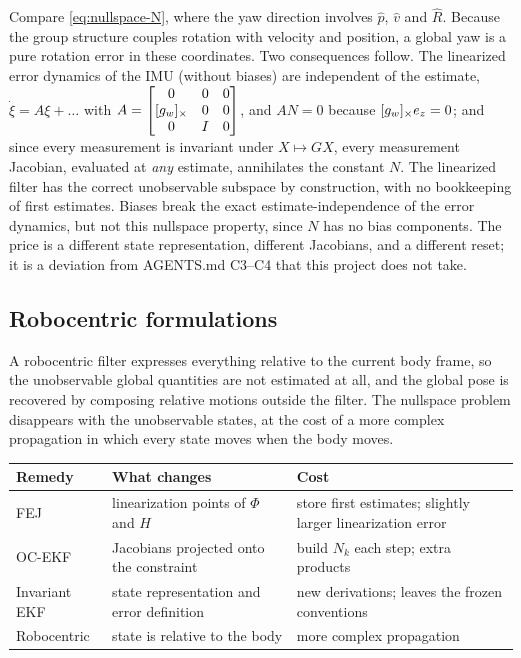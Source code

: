 Compare \eqref{eq:nullspace-N}, where the yaw direction involves $\hat p$, $\hat v$ and $\hat R$. Because the group structure couples rotation with velocity
and position, a global yaw is a pure rotation error in these coordinates. Two consequences follow. The linearized error dynamics of the IMU (without
biases) are independent of the estimate, $\dot\xi = A\xi + \dots$ with
$A = \begin{bmatrix} 0 & 0 & 0 \\ \sx{g_w} & 0 & 0 \\ 0 & I & 0 \end{bmatrix}$, and $AN = 0$ because $[g_w]_{\times}e_z = 0$; and since every measurement is invariant under
$X \mapsto GX$, every measurement Jacobian, evaluated at \emph{any} estimate, annihilates the constant $N$. The linearized filter has the correct
unobservable subspace by construction, with no bookkeeping of first estimates. Biases break the exact estimate-independence of the error dynamics,
but not this nullspace property, since $N$ has no bias components. The price is a different state representation, different Jacobians, and a different reset;
it is a deviation from AGENTS.md C3--C4 that this project does not take.

\subsection{Robocentric formulations}

A robocentric filter expresses everything relative to the current body frame, so the unobservable global quantities are not estimated at all,
and the global pose is recovered by composing relative motions outside the filter. The nullspace problem disappears with the unobservable states,
at the cost of a more complex propagation in which every state moves when the body moves.

\begin{center}\small
\begin{tabularx}{\linewidth}{@{}l>{\raggedright\arraybackslash}X>{\raggedright\arraybackslash}X@{}}
\toprule
Remedy & What changes & Cost \\
\midrule
FEJ & linearization points of $\Phi$ and $H$ & store first estimates; slightly larger linearization error \\
OC-EKF & Jacobians projected onto the constraint & build $N_k$ each step; extra products \\
Invariant EKF & state representation and error definition & new derivations; leaves the frozen conventions \\
Robocentric & state is relative to the body & more complex propagation \\
\bottomrule
\end{tabularx}
\end{center}


